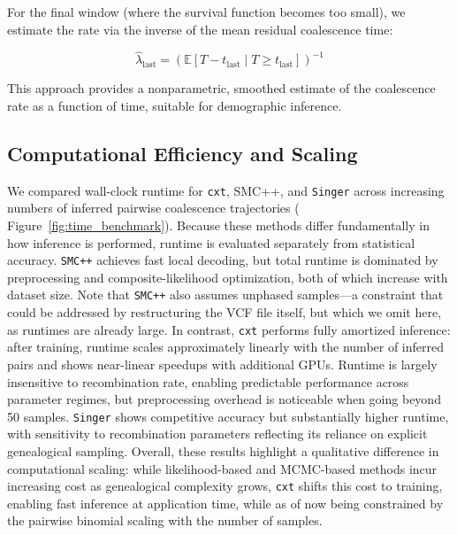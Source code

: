 \documentclass[9pt,twoside]{pnas-new}
\newcommand{\cxtkit}{\texttt{cxt}\xspace}
\newcommand{\singer}{\texttt{Singer}\xspace}
\newcommand{\smcpp}{\texttt{SMC++}\xspace}
\begin{document}
For the final window (where the survival function becomes too small), 
we estimate the rate via the inverse of the mean residual coalescence time:

\[
\hat{\lambda}_{\text{last}} = \left( \mathbb{E}[T - t_{\text{last}} \mid T \geq t_{\text{last}}] \right)^{-1}
\]

This approach provides a nonparametric, smoothed estimate of the coalescence rate as a function of time, suitable for demographic inference.


\subsection*{Computational Efficiency and Scaling}

We compared wall-clock runtime for \cxtkit, SMC++, and \singer 
across increasing numbers of inferred pairwise coalescence trajectories ( Figure~\ref{fig:time_benchmark}). 
Because these methods differ fundamentally in how inference is performed, 
runtime is evaluated separately from statistical accuracy.
\smcpp achieves fast local decoding, but total runtime is dominated by preprocessing and composite-likelihood 
optimization, both of which increase with dataset size. 
Note that \smcpp also assumes unphased samples---a constraint that could be addressed by restructuring the VCF file itself, 
but which we omit here, as runtimes are already large. 
In contrast, \cxtkit performs fully amortized inference: 
after training, runtime scales approximately linearly with the number of inferred pairs and shows near-linear speedups with additional GPUs. 
Runtime is largely insensitive to recombination rate, 
enabling predictable performance across parameter regimes, 
but preprocessing overhead is noticeable 
when going beyond 50 samples.
\singer shows competitive accuracy but substantially higher runtime, 
with sensitivity to recombination parameters reflecting its reliance on explicit genealogical sampling. 
Overall, these results highlight a qualitative difference in computational scaling: 
while likelihood-based and MCMC-based methods incur increasing cost as genealogical complexity grows, 
\cxtkit shifts this cost to training, enabling fast inference at application time, 
while as of now being constrained by the pairwise binomial scaling with the number of samples.
\end{document}
